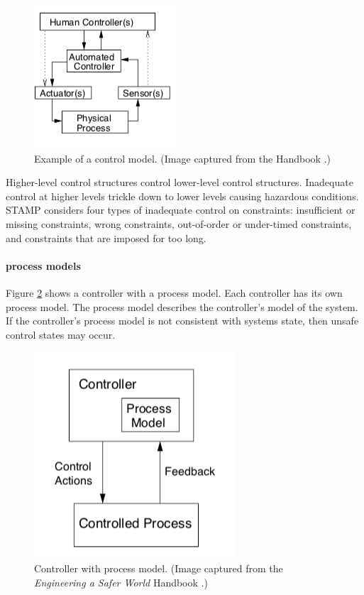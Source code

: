 \documentclass[../../main/main.tex]{subfiles}
\begin{document}
\begin{figure}[h!]
\centering
\includegraphics[width=0.5\linewidth]{../figures/controlmodel}
\caption{\label{controlmodel} Example of a control model. (Image captured from the  Handbook \cite{stpa}.)}
\end{figure}
Higher-level control structures control lower-level control structures.  Inadequate control at higher levels trickle down to lower levels causing hazardous conditions.  STAMP considers four types of inadequate control on constraints: insufficient or missing constraints, wrong constraints, out-of-order or under-timed constraints, and constraints that are imposed for too long. 

\paragraph*{process models}
Figure \ref{processmodel} shows a controller with a process model.  Each controller has its own process model.  The process model describes the controller's model of the system.  If the controller's process model is not consistent with systems state, then unsafe control states may occur.

\begin{figure}[h!]
\centering
\includegraphics[width=0.5\linewidth]{../figures/processmodel}
\caption{\label{processmodel} Controller with process model. (Image captured from the \textit{Engineering a Safer World} Handbook \cite{safe}.)}
\end{figure}
\end{document}
